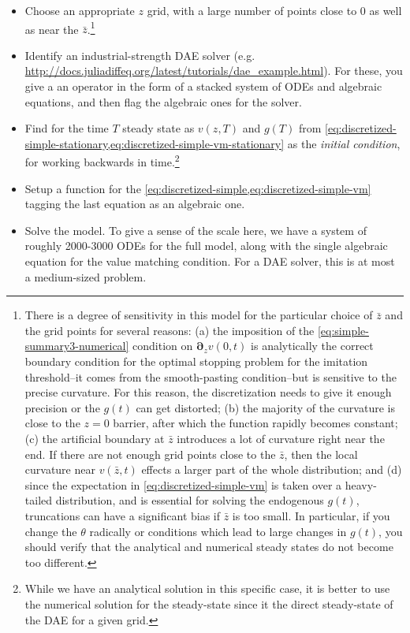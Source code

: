 \documentclass[11pt]{article}
\newcommand{\D}[1][]{\ensuremath{\boldsymbol{\partial}_{#1}}}
\begin{document}
\begin{itemize}
	\item Choose an appropriate $z$ grid, with a large number of points close to $0$ as well as near the $\bar{z}$.\footnote{There is a degree of sensitivity in this model for the particular choice of $\bar{z}$ and the grid points for several reasons: (a) the imposition of the \cref{eq:simple-summary3-numerical} condition on $\D[z]v(0,t)$  is analytically the correct boundary condition for the optimal stopping problem for the imitation threshold--it comes from the smooth-pasting condition--but is sensitive to the precise curvature.  For this reason, the discretization needs to give it enough precision or the $g(t)$ can get distorted; (b) the majority of the curvature is close to the $z=0$ barrier, after which the function rapidly becomes constant; (c) the artificial boundary at $\bar{z}$ introduces a lot of curvature right near the end.  If there are not enough grid points close to the $\bar{z}$, then the local curvature near $v(\bar{z},t)$ effects a larger part of the whole distribution; and (d) since the expectation in \cref{eq:discretized-simple-vm} is taken over a heavy-tailed distribution, and is essential for solving the endogenous $g(t)$, truncations can have a significant bias if $\bar{z}$ is too small.  In particular, if you change the $\theta$ radically or conditions which lead to large changes in $g(t)$, you should verify that the analytical and numerical steady states do not become too different.}
	\item Identify an industrial-strength DAE solver (e.g. \url{http://docs.juliadiffeq.org/latest/tutorials/dae_example.html}).  For these, you give a an operator in the form of a stacked system of ODEs and algebraic equations, and then flag the algebraic ones for the solver.
	\item Find for the time $T$ steady state as $v(z,T)$ and $g(T)$ from \cref{eq:discretized-simple-stationary,eq:discretized-simple-vm-stationary} as the \textit{initial condition}, for working backwards in time.\footnote{While we have an analytical solution in this specific case, it is better to use the numerical solution for the steady-state since it the direct steady-state of the DAE for a given grid.} 
	\item Setup a function for the \cref{eq:discretized-simple,eq:discretized-simple-vm} tagging the last equation as an algebraic one.
	\item Solve the model.  To give a sense of the scale here, we have a system of roughly 2000-3000 ODEs for the full model, along with the single algebraic equation for the value matching condition.  For a DAE solver, this is at most a medium-sized problem.
\end{itemize}
\end{document}
